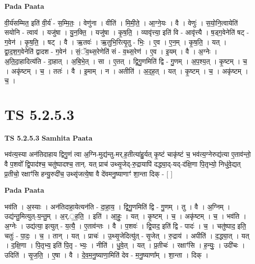 \documentclass[17pt]{extarticle}
\begin{document}
\textbf{Pada Paata} \newline

वी॒र्य॑सम्मित॒ इति॑ वी॒र्य॑ - स॒म्मि॒तः॒ । वेणु॑ना । वीति॑ । मि॒मी॒ते॒ । आ॒ग्ने॒यः । वै । वेणुः॑ । स॒यो॒नि॒त्वायेति॑ सयोनि - त्वाय॑ । यजु॑षा । यु॒न॒क्ति॒ । यजु॑षा । कृ॒ष॒ति॒ । व्यावृ॑त्त्या॒ इति॑ वि - आवृ॑त्त्यै । ष॒ड्ग॒वेनेति॑ षट् - ग॒वेन॑ । कृ॒ष॒ति॒ । षट् । वै । ऋ॒तवः॑ । ऋ॒तुभि॒रित्यृ॒तु - भिः॒ । ए॒व । ए॒न॒म् । कृ॒ष॒ति॒ । यत् । द्वा॒द॒श॒ग॒वेनेति॑ द्वादश - ग॒वेन॑ । सं॒ॅव॒थ्स॒रेणेति॑ सं - व॒थ्स॒रेण॑ । ए॒व । इ॒यम् । वै । अ॒ग्नेः । अ॒ति॒दा॒हादित्य॑ति - दा॒हात् । अ॒बि॒भे॒त् । सा । ए॒तत् । द्वि॒गु॒णमिति॑ द्वि - गु॒णम् । अ॒प॒श्य॒त् । कृ॒ष्टम् । च॒ । अकृ॑ष्टम् । च॒ । ततः॑ । वै । इ॒माम् । न । अतीति॑ । अ॒द॒ह॒त् । यत् । कृ॒ष्टम् । च॒ । अकृ॑ष्टम् । च॒ ।  \newline





\section{ TS 5.2.5.3 }

\textbf{TS 5.2.5.3 } \newline
\textbf{Samhita Paata} \newline

भव॑त्य॒स्या अन॑तिदाहाय द्विगु॒णं त्वा अ॒ग्नि-मुद्य॑न्तु-मर्.ह॒तीत्या॑हु॒र्यत् कृ॒ष्टं चाकृ॑ष्टं च॒ भव॑त्य॒ग्नेरुद्य॑त्या ए॒ताव॑न्तो॒ वै प॒शवो᳚ द्वि॒पाद॑श्च॒ चतु॑ष्पादश्च॒ तान्. यत् प्राच॑ उथ्सृ॒जेद्-रु॒द्रायापि॑ दद्ध्या॒द्-यद्-द॑क्षि॒णा पि॒तृभ्यो॒ निधु॑वे॒द्यत् प्र॒तीचो॒ रक्षाꣳ॑सि हन्यु॒रुदी॑च॒ उथ्सृ॑जत्ये॒षा वै दे॑वमनु॒ष्याणाꣳ॑ शा॒न्ता दिक् - [  ] \newline

\textbf{Pada Paata} \newline

भव॑ति । अ॒स्याः । अन॑तिदाहा॒येत्यन॑ति - दा॒हा॒य॒ । द्वि॒गु॒णमिति॑ द्वि - गु॒णम् । तु । वै । अ॒ग्निम् । उद्य॑न्तु॒मित्युत्-य॒न्तु॒म् । अ॒र्.॒ह॒ति॒ । इति॑ । आ॒हुः॒ । यत् । कृ॒ष्टम् । च॒ । अकृ॑ष्टम् । च॒ । भव॑ति । अ॒ग्नेः । उद्य॑त्या॒ इत्युत् - य॒त्यै॒ । ए॒ताव॑न्तः । वै । प॒शवः॑ । द्वि॒पाद॒ इति॑ द्वि - पादः॑ । च॒ । चतु॑ष्पाद॒ इति॒ चतुः॑ - पा॒दः॒ । च॒ । तान् । यत् । प्राचः॑ । उ॒थ्सृ॒जेदित्यु॑त् - सृ॒जेत् । रु॒द्राय॑ । अपीति॑ । द॒द्ध्या॒त् । यत् । द॒क्षि॒णा । पि॒तृभ्य॒ इति॑ पि॒तृ - भ्यः॒ । नीति॑ । धु॒वे॒त् । यत् । प्र॒तीचः॑ । रक्षाꣳ॑सि । ह॒न्युः॒ । उदी॑चः । उदिति॑ । सृ॒ज॒ति॒ । ए॒षा । वै । दे॒व॒म॒नु॒ष्याणा॒मिति॑ देव - म॒नु॒ष्याणा᳚म् । शा॒न्ता । दिक् ।  \newline
\end{document}
